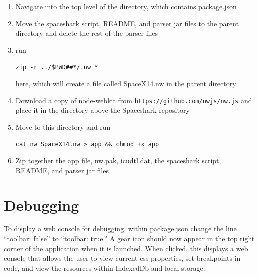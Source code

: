 \documentclass{hmcclinic}
\begin{document}
\begin{enumerate}
  \item Navigate into the top level of the directory, which contains
    package.json
  \item Move the spaceshark script, README, and parser jar files to the parent directory
    and delete the rest of the parser files
  \item run
    \begin{center}\texttt{zip -r ../\${PWD\#\#*/}.nw *}\end{center} here, which will create a file
    called SpaceX14.nw in the parent directory
  \item Download a copy of node-webkit from
    \texttt{https://github.com/nwjs/nw.js} and
    place it in the directory above the Spaceshark repository
  \item Move to this directory and run 
    \begin{center}\texttt{cat nw SpaceX14.nw >
      app \&\& chmod +x app}\end{center}
  \item Zip together the app file, nw.pak, icudtl.dat, the spaceshark script,
    README, and parser jar files
\end{enumerate}

\newpage
\section{Debugging}
To display a web console for debugging, within package.json change the line
``toolbar: false'' to ``toolbar: true.'' A gear icon should now appear in the
top right corner of the application when it is launched. When clicked, this
displays a web console that allows the user to view current css properties,
set breakpoints in code, and view the resources within IndexedDb and local
storage.
\end{document}
